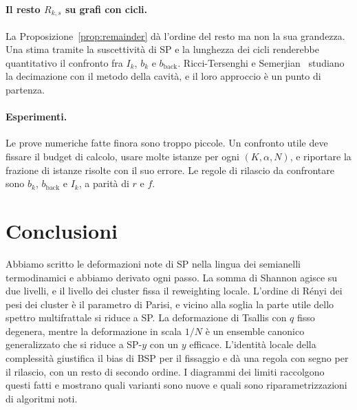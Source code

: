 \paragraph{Il resto $R_{k,s}$ su grafi con cicli.}
La Proposizione~\ref{prop:remainder} dà l'ordine del resto ma non la sua grandezza.
Una stima tramite la suscettività di SP e la lunghezza dei cicli renderebbe quantitativo il confronto fra $I_k$, $b_k$ e $b_{\mathrm{back}}$.
Ricci-Tersenghi e Semerjian~\citep{ricci2009cavity} studiano la decimazione con il metodo della cavità, e il loro approccio è un punto di partenza.

\paragraph{Esperimenti.}
Le prove numeriche fatte finora sono troppo piccole.
Un confronto utile deve fissare il budget di calcolo, usare molte istanze per ogni $(K,\alpha,N)$, e riportare la frazione di istanze risolte con il suo errore.
Le regole di rilascio da confrontare sono $b_k$, $b_{\mathrm{back}}$ e $I_k$, a parità di $r$ e $f$.

\section{Conclusioni}

Abbiamo scritto le deformazioni note di SP nella lingua dei semianelli termodinamici e abbiamo derivato ogni passo.
La somma di Shannon agisce su due livelli, e il livello dei cluster fissa il reweighting locale.
L'ordine di Rényi dei pesi dei cluster è il parametro di Parisi, e vicino alla soglia la parte utile dello spettro multifrattale si riduce a SP.
La deformazione di Tsallis con $q$ fisso degenera, mentre la deformazione in scala $1/N$ è un ensemble canonico generalizzato che si riduce a SP-$y$ con un $y$ efficace.
L'identità locale della complessità giustifica il bias di BSP per il fissaggio e dà una regola con segno per il rilascio, con un resto di secondo ordine.
I diagrammi dei limiti raccolgono questi fatti e mostrano quali varianti sono nuove e quali sono riparametrizzazioni di algoritmi noti.
